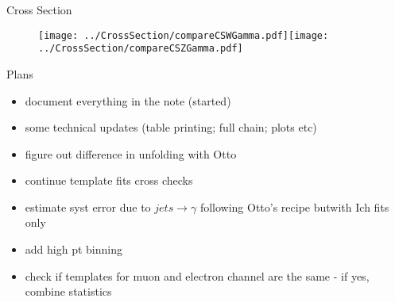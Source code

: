 \documentclass{beamer}
\begin{document}
\begin{frame}{Cross Section}
  \begin{figure}
    \centering
    \texttt{[image: ../CrossSection/compareCSWGamma.pdf]}\texttt{[image: ../CrossSection/compareCSZGamma.pdf]}
  \end{figure}
\end{frame}

\begin{frame}{Plans}
{
  \begin{itemize}
  \item document everything in the note (started)
  \item some technical updates (table printing; full chain; plots etc)
  \item figure out difference in unfolding with Otto
  \item continue template fits cross checks
  \item estimate syst error due to $jets \rightarrow \gamma$ following Otto's recipe butwith Ich fits only
  \item add high pt binning
  \item check if templates for muon and electron channel are the same - if yes, combine statistics
  \end{itemize}
}
\end{frame}
\end{document}

